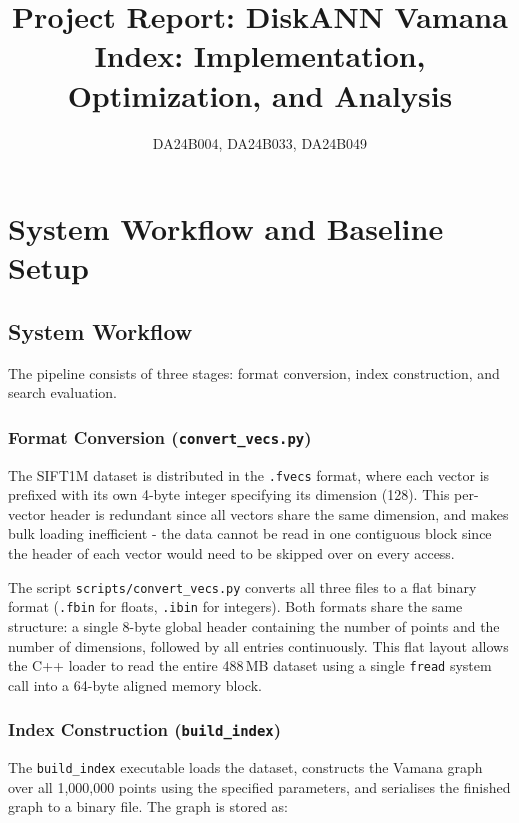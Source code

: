 \documentclass[10pt]{article}
\title{Project Report: DiskANN Vamana Index: Implementation, Optimization, and Analysis}
\author{DA24B004, DA24B033, DA24B049}
\date{}
\begin{document}
\maketitle

\section{System Workflow and Baseline Setup}

\subsection{System Workflow}

The pipeline consists of three stages: format conversion, index 
construction, and search evaluation.

\subsubsection{Format Conversion (\texttt{convert\_vecs.py})}

The SIFT1M dataset is distributed in the \texttt{.fvecs} format, where each 
vector is prefixed with its own 4-byte integer specifying its dimension (128). 
This per-vector header is redundant since all vectors share the same dimension, and makes bulk loading inefficient - the data cannot be read in one contiguous block since the header of each vector would need to be skipped over on every access.

The script \texttt{scripts/convert\_vecs.py} converts all three files to a 
flat binary format (\texttt{.fbin} for floats, \texttt{.ibin} for integers). Both formats share the same structure: a single 8-byte 
global header containing the number of points and the number of dimensions, 
followed by all entries continuously. This flat layout allows the C++ loader to read the entire 488\,MB dataset 
using a single \texttt{fread} system call into a 64-byte aligned memory 
block.

\subsubsection{Index Construction (\texttt{build\_index})}

The \texttt{build\_index} executable loads the dataset, constructs the Vamana graph over all 1,000,000 points using the specified parameters, and serialises the finished graph to a binary file. The graph is stored as:
\end{document}
